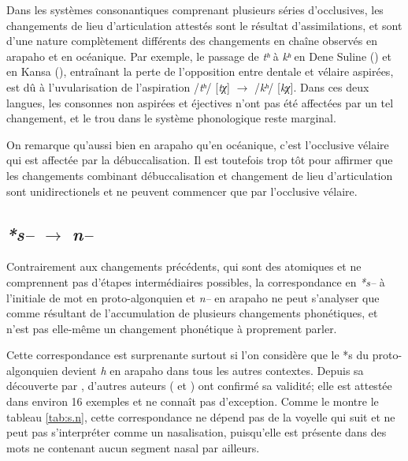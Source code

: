 \documentclass[twoside,a4paper,11pt]{article}
\newcommand{\ipa}[1]{{\phon\textit{#1}}}
\newcommand{\Σ}{\greek{Σ}}
\begin{document}
Dans les systèmes consonantiques comprenant plusieurs séries d'occlusives, les changements de lieu d'articulation attestés sont le résultat d'assimilations, et sont d'une nature complètement différents des changements en chaîne observés en arapaho et en océanique. Par exemple, le passage de \ipa{tʰ} à \ipa{kʰ} en Dene Suline (\citealt{haas68chipewyan}) et en Kansa (\citealt{csd2006}), entraînant la perte de l'opposition entre dentale et vélaire aspirées, est dû à l'uvularisation de l'aspiration /\ipa{tʰ}/ [\ipa{tχ}] $\rightarrow$ /\ipa{kʰ}/ [\ipa{kχ}]. Dans ces deux langues, les consonnes non aspirées et éjectives n'ont pas été affectées par un tel changement, et le trou dans le système phonologique reste marginal.
 
On remarque qu'aussi bien en arapaho qu'en océanique, c'est l'occlusive vélaire qui est affectée par la débuccalisation. Il est toutefois trop tôt pour affirmer que les changements combinant débuccalisation et changement de lieu d'articulation sont unidirectionels et ne peuvent commencer que par l'occlusive vélaire.


\subsection{\ipa{*s--} $\rightarrow$ \ipa{n--} }
Contrairement aux changements   précédents, qui sont des atomiques et ne comprennent pas d'étapes intermédiaires possibles, la correspondance en \ipa{*s--} à l'initiale de mot en proto-algonquien et \ipa{n--} en arapaho ne peut s'analyser que comme résultant de l'accumulation de plusieurs changements phonétiques, et n'est pas elle-même un changement phonétique à proprement parler.

Cette correspondance est surprenante surtout si l'on considère que le *s du proto-algonquien devient \ipa{h} en arapaho dans tous les autres contextes. Depuis sa découverte par \citet{goddard74arapaho}, d'autres auteurs (\citealt{pentland98} et \citealt{jacques13arapaho}) ont confirmé sa validité; elle est attestée dans environ 16 exemples  et ne connaît pas d'exception. Comme le montre le tableau \ref{tab:s.n}, cette correspondance ne dépend pas de la voyelle qui suit et ne peut pas s'interpréter comme un nasalisation, puisqu'elle est présente dans des mots ne contenant aucun segment nasal par ailleurs. 
\end{document}
